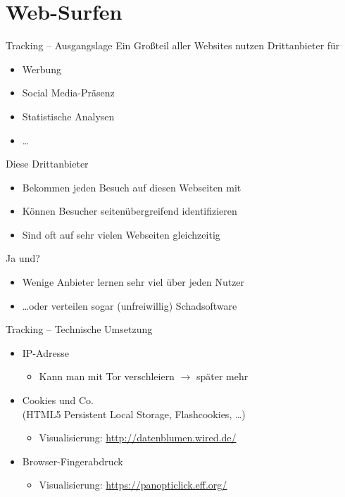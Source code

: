 \section{Web-Surfen}
\begin{frame}{Tracking -- Ausgangslage}
  Ein Großteil aller Websites nutzen Drittanbieter für
  \begin{itemize}
    \item Werbung
    \item \glqq Social Media\grqq-Präsenz
    \item Statistische Analysen
    \item \dots
  \end{itemize}
  \pause
  Diese Drittanbieter
  \begin{itemize}
    \item Bekommen jeden Besuch auf diesen Webseiten mit
    \item Können Besucher seitenübergreifend identifizieren
    \item Sind oft auf sehr vielen Webseiten gleichzeitig
  \end{itemize}
  \pause
  Ja und?
  \pause
  \begin{itemize}
    \item Wenige Anbieter lernen sehr viel über jeden Nutzer
    \item \dots oder verteilen sogar (unfreiwillig) Schadsoftware
  \end{itemize}
\end{frame}

\begin{frame}{Tracking -- Technische Umsetzung}
  \begin{itemize}
    \item IP-Adresse
    \begin{itemize}
      \item Kann man mit Tor verschleiern $\rightarrow$ später mehr
    \end{itemize}
    \item Cookies und Co.\\ (HTML5 Persistent Local Storage, Flashcookies, \dots)
    \begin{itemize}
      \item Visualisierung: \url{http://datenblumen.wired.de/}
    \end{itemize}
    \item Browser-Fingerabdruck
    \begin{itemize}
      \item Visualisierung: \url{https://panopticlick.eff.org/}
    \end{itemize}
  \end{itemize}
\end{frame}

